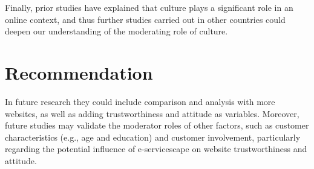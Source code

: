 \documentclass[a4paper]{article}
\begin{document}
Finally, prior studies have explained that culture plays a significant role in an online context, and thus further studies carried out in other countries could deepen our understanding of the moderating role of culture.

\section{Recommendation}

In future research they could include comparison and analysis with more websites, as well as adding trustworthiness and attitude as variables. Moreover, future studies may validate the moderator roles of other factors, such as customer characteristics (e.g., age and education) and customer involvement, particularly regarding the potential influence of e-servicescape on website trustworthiness and attitude.
\end{document}
